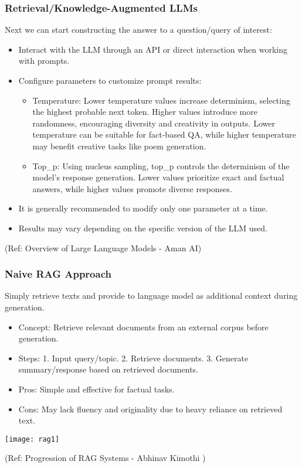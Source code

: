 \begin{frame}[fragile]\frametitle{Retrieval/Knowledge-Augmented LLMs}

Next we can start constructing the answer to a question/query of interest:

\begin{itemize}
\item Interact with the LLM through an API or direct interaction when working with prompts.
\item Configure parameters to customize prompt results:

\begin{itemize}
\item Temperature: Lower temperature values increase determinism, selecting the highest probable next token. Higher values introduce more randomness, encouraging diversity and creativity in outputs. Lower temperature can be suitable for fact-based QA, while higher temperature may benefit creative tasks like poem generation.
\item Top\_p: Using nucleus sampling, top\_p controls the determinism of the model's response generation. Lower values prioritize exact and factual answers, while higher values promote diverse responses.
\end{itemize}

\item It is generally recommended to modify only one parameter at a time.
\item Results may vary depending on the specific version of the LLM used.
\end{itemize}

{\tiny (Ref: Overview of Large Language Models - Aman AI)}

\end{frame}


\begin{frame}[fragile]\frametitle{Naive RAG Approach}

Simply retrieve texts and provide to language model as additional context during generation.

\begin{itemize}
\item Concept: Retrieve relevant documents from an external corpus before generation.
\item Steps: 1. Input query/topic. 2. Retrieve documents. 3. Generate summary/response based on retrieved documents.
\item Pros: Simple and effective for factual tasks.
\item Cons: May lack fluency and originality due to heavy reliance on retrieved text.
\end{itemize}	

\begin{center}
\texttt{[image: rag1]}

{\tiny (Ref: Progression of RAG Systems - Abhinav Kimothi )}
\end{center}		

\end{frame}

